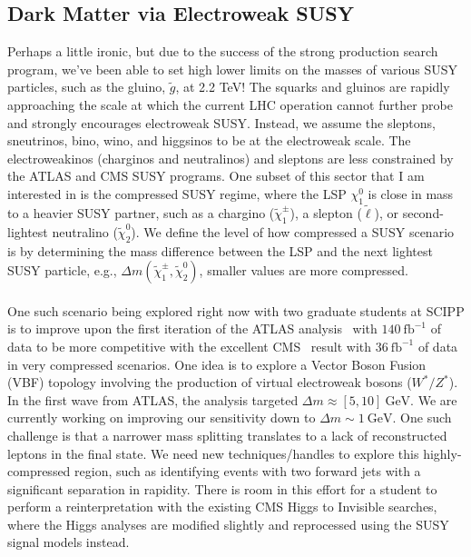 \documentclass[10pt,a4paper,sans]{moderncv} %
\begin{document}
\subsection{Dark Matter via Electroweak SUSY}
Perhaps a little ironic, but due to the success of the strong production search program, we've been able to set high lower limits on the masses of various SUSY particles, such as the gluino, $\tilde{g}$, at 2.2 TeV! The squarks and gluinos are rapidly approaching the scale at which the current LHC operation cannot further probe and strongly encourages electroweak SUSY. Instead, we assume the sleptons, sneutrinos, bino, wino, and higgsinos to be at the electroweak scale. The electroweakinos (charginos and neutralinos) and sleptons are less constrained by the ATLAS and CMS SUSY programs.  One subset of this sector that I am interested in is the compressed SUSY regime, where the LSP $\chi_1^0$ is close in mass to a heavier SUSY partner, such as a chargino ($\tilde{\chi}_1^\pm$), a slepton ($\tilde{\ell}$), or second-lightest neutralino ($\tilde{\chi}_2^0$). We define the level of how compressed a SUSY scenario is by determining the mass difference between the LSP and the next lightest SUSY particle, e.g., $\Delta m(\tilde{\chi}_1^\pm, \tilde{\chi}_2^0)$, smaller values are more compressed.
\\
\\
One such scenario being explored right now with two graduate students at SCIPP is to improve upon the first iteration of the ATLAS analysis~\cite{ATLAS:2019lng} with $140\ \mathrm{fb}^{-1}$ of data to be more competitive with the excellent CMS~\cite{CMS:2019san} result with $36\ \mathrm{fb}^{-1}$ of data in very compressed scenarios. One idea is to explore a Vector Boson Fusion (VBF) topology involving the production of virtual electroweak bosons ($W^*/ Z^*$). In the first wave from ATLAS, the analysis targeted $\Delta m \approx [5, 10]\ \mathrm{GeV}$. We are currently working on improving our sensitivity down to $\Delta m \sim 1\ \mathrm{GeV}$. One such challenge is that a narrower mass splitting translates to a lack of reconstructed leptons in the final state. We need new techniques/handles to explore this highly-compressed region, such as identifying events with two forward jets with a significant separation in rapidity. There is room in this effort for a student to perform a reinterpretation with the existing CMS Higgs to Invisible searches, where the Higgs analyses are modified slightly and reprocessed using the SUSY signal models instead.
\end{document}
